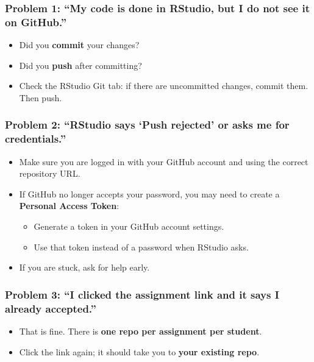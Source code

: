 \documentclass[11pt]{scrartcl}
\begin{document}
\begin{warningBox}

\subsubsection*{Problem 1: ``My code is done in RStudio, but I do not see it on GitHub.''}
\begin{itemize}[nosep]
  \item Did you \textbf{commit} your changes?
  \item Did you \textbf{push} after committing?
  \item Check the RStudio Git tab: if there are uncommitted changes, commit them. Then push.
\end{itemize}

\subsubsection*{Problem 2: ``RStudio says `Push rejected' or asks me for credentials.''}
\begin{itemize}[nosep]
  \item Make sure you are logged in with your GitHub account and using the correct repository URL.
  \item If GitHub no longer accepts your password, you may need to create a \textbf{Personal Access Token}:
    \begin{itemize}[nosep]
      \item Generate a token in your GitHub account settings.
      \item Use that token instead of a password when RStudio asks.
    \end{itemize}
  \item If you are stuck, ask for help early.
\end{itemize}

\subsubsection*{Problem 3: ``I clicked the assignment link and it says I already accepted.''}
\begin{itemize}[nosep]
  \item That is fine. There is \textbf{one repo per assignment per student}.
  \item Click the link again; it should take you to \textbf{your existing repo}.
\end{itemize}


\end{warningBox}
\end{document}
